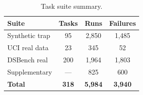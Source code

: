 \begin{table}[t]
\centering
\caption{Task suite summary.}
\label{tab:task-summary}
\small
\begin{tabular}{@{}lccc@{}}
\toprule
Suite & Tasks & Runs & Failures \\
\midrule
Synthetic trap & 95 & 2{,}850 & 1{,}485 \\
UCI real data & 23 & 345 & 52 \\
DSBench real & 200 & 1{,}964 & 1{,}803 \\
Supplementary & --- & 825 & 600 \\
\midrule
\textbf{Total} & \textbf{318} & \textbf{5{,}984} & \textbf{3{,}940} \\
\bottomrule
\end{tabular}
\end{table}
